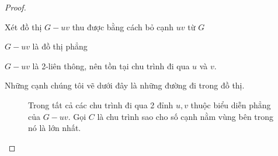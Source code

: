 \begin{proof}
\begin{enumerate}
\begin{tikzpicture}
              \end{tikzpicture}
    \end{enumerate}


    Xét đồ thị $G-uv$ thu được bằng cách bỏ cạnh $uv$ từ $G$

    $G-uv$ là đồ thị phẳng

    $G-uv$ là 2-liên thông, nên tồn tại chu trình đi qua $u$ và $v$.

    \begin{remark}
        Những cạnh chúng tôi vẽ dưới đây là những đường đi trong đồ thị.
    \end{remark}

    \begin{figure}[H]
        \begin{minipage}{0.4\textwidth}
        \end{minipage}
        \hfill
        \begin{minipage}{0.5\textwidth}
            Trong tất cả các chu trình đi qua 2 đỉnh $u,v$ thuộc biểu diễn phẳng của $G-uv$.
            Gọi $C$ là chu trình sao cho số cạnh nằm vùng bên trong nó là lớn nhất.
        \end{minipage}

    \end{figure}



\end{proof}
